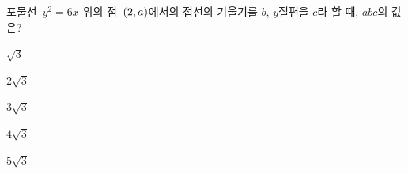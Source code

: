 포물선~$y^2=6x$ 위의 점~$(2{,}\mkern3mu\mathopen{}a)$에서의 접선의 기울기를 $b$, $y$절편을 $c$라 할 때, $abc$의 값은? 
\begin{choices32}{\rule[-3ex]{0pt}{8ex}$\sqrt{3}$}{\rule[-3ex]{0pt}{8ex}$2\sqrt{3}$}{\rule[-3ex]{0pt}{8ex}$3\sqrt{3}$}{\rule[-3ex]{0pt}{8ex}$4\sqrt{3}$}{\rule[-3ex]{0pt}{8ex}$5\sqrt{3}$}\end{choices32}
